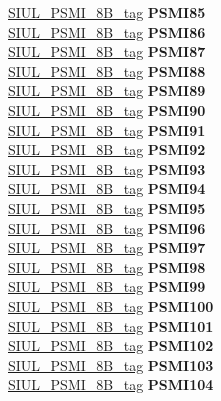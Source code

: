 \begin{DoxyCompactItemize}
\begin{tabbing}
\>\>\mbox{\hyperlink{unionSIUL__PSMI__8B__tag}{SIUL\_PSMI\_8B\_tag}} {\bfseries PSMI85}\\
\>\>\mbox{\hyperlink{unionSIUL__PSMI__8B__tag}{SIUL\_PSMI\_8B\_tag}} {\bfseries PSMI86}\\
\>\>\mbox{\hyperlink{unionSIUL__PSMI__8B__tag}{SIUL\_PSMI\_8B\_tag}} {\bfseries PSMI87}\\
\>\>\mbox{\hyperlink{unionSIUL__PSMI__8B__tag}{SIUL\_PSMI\_8B\_tag}} {\bfseries PSMI88}\\
\>\>\mbox{\hyperlink{unionSIUL__PSMI__8B__tag}{SIUL\_PSMI\_8B\_tag}} {\bfseries PSMI89}\\
\>\>\mbox{\hyperlink{unionSIUL__PSMI__8B__tag}{SIUL\_PSMI\_8B\_tag}} {\bfseries PSMI90}\\
\>\>\mbox{\hyperlink{unionSIUL__PSMI__8B__tag}{SIUL\_PSMI\_8B\_tag}} {\bfseries PSMI91}\\
\>\>\mbox{\hyperlink{unionSIUL__PSMI__8B__tag}{SIUL\_PSMI\_8B\_tag}} {\bfseries PSMI92}\\
\>\>\mbox{\hyperlink{unionSIUL__PSMI__8B__tag}{SIUL\_PSMI\_8B\_tag}} {\bfseries PSMI93}\\
\>\>\mbox{\hyperlink{unionSIUL__PSMI__8B__tag}{SIUL\_PSMI\_8B\_tag}} {\bfseries PSMI94}\\
\>\>\mbox{\hyperlink{unionSIUL__PSMI__8B__tag}{SIUL\_PSMI\_8B\_tag}} {\bfseries PSMI95}\\
\>\>\mbox{\hyperlink{unionSIUL__PSMI__8B__tag}{SIUL\_PSMI\_8B\_tag}} {\bfseries PSMI96}\\
\>\>\mbox{\hyperlink{unionSIUL__PSMI__8B__tag}{SIUL\_PSMI\_8B\_tag}} {\bfseries PSMI97}\\
\>\>\mbox{\hyperlink{unionSIUL__PSMI__8B__tag}{SIUL\_PSMI\_8B\_tag}} {\bfseries PSMI98}\\
\>\>\mbox{\hyperlink{unionSIUL__PSMI__8B__tag}{SIUL\_PSMI\_8B\_tag}} {\bfseries PSMI99}\\
\>\>\mbox{\hyperlink{unionSIUL__PSMI__8B__tag}{SIUL\_PSMI\_8B\_tag}} {\bfseries PSMI100}\\
\>\>\mbox{\hyperlink{unionSIUL__PSMI__8B__tag}{SIUL\_PSMI\_8B\_tag}} {\bfseries PSMI101}\\
\>\>\mbox{\hyperlink{unionSIUL__PSMI__8B__tag}{SIUL\_PSMI\_8B\_tag}} {\bfseries PSMI102}\\
\>\>\mbox{\hyperlink{unionSIUL__PSMI__8B__tag}{SIUL\_PSMI\_8B\_tag}} {\bfseries PSMI103}\\
\>\>\mbox{\hyperlink{unionSIUL__PSMI__8B__tag}{SIUL\_PSMI\_8B\_tag}} {\bfseries PSMI104}\\

\end{tabbing}
\end{DoxyCompactItemize}

